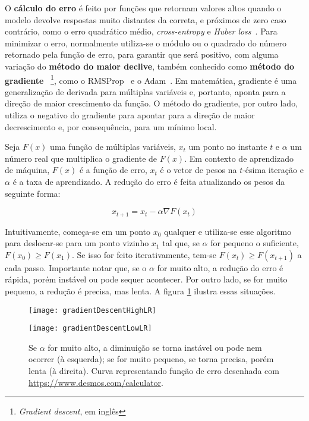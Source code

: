 O \textbf{cálculo do erro} é feito por funções que retornam valores altos quando o modelo devolve respostas muito distantes da correta, e próximos de zero caso contrário, como o erro quadrático médio, \textit{cross-entropy} e \textit{Huber loss}~\cite{huber_loss}.
Para minimizar o erro, normalmente utiliza-se o módulo ou o quadrado do número retornado pela função de erro, para garantir que será positivo, com alguma variação do \textbf{método do maior declive}, também conhecido como \textbf{método do gradiente}~\cite{cauchy1847} \footnote{\textit{Gradient descent}, em inglês}, como o RMSProp~\cite{rmsprop} e o Adam~\cite{DBLP:journals/corr/KingmaB14}.
Em matemática, gradiente é uma generalização de derivada para múltiplas variáveis e, portanto, aponta para a direção de maior crescimento da função.
O método do gradiente, por outro lado, utiliza o negativo do gradiente para apontar para a direção de maior decrescimento e, por consequência, para um mínimo local.

Seja $F(x)$ uma função de múltiplas variáveis, $x_{t}$ um ponto no instante $t$ e $\alpha$ um número real que multiplica o gradiente de $F(x)$.
Em contexto de aprendizado de máquina, $F(x)$ é a função de erro, $x_{t}$ é o vetor de pesos na $t$-ésima iteração e $\alpha$ é a taxa de aprendizado.
A redução do erro é feita atualizando os pesos da seguinte forma:

\begin{equation} \label{eq:error_update}
x_{t+1} = x_{t} - \alpha \nabla F(x_{t})
\end{equation}

Intuitivamente, começa-se em um ponto $x_{0}$ qualquer e utiliza-se esse algoritmo para deslocar-se para um ponto vizinho $x_{1}$ tal que, se $\alpha$ for pequeno o suficiente, $F(x_{0}) \geq F(x_{1})$.
Se isso for feito iterativamente, tem-se $F(x_{t}) \geq F(x_{t+1})$ a cada passo.
Importante notar que, se o $\alpha$ for muito alto, a redução do erro é rápida, porém instável ou pode sequer acontecer.
Por outro lado, se for muito pequeno, a redução é precisa, mas lenta.
A figura \ref{fig:gradientDescent} ilustra essas situações.

\begin{figure}[h!]
  \begin{minipage}[b]{.45\textwidth}
  \centering
  \texttt{[image: gradientDescentHighLR]}
  \label{fig:gdhighlr}
  \end{minipage}
  \hfill
  \begin{minipage}[b]{.45\textwidth}
  \centering
  \texttt{[image: gradientDescentLowLR]}
  \label{fig:gdlowlr}
  \end{minipage}
  \caption{Se $\alpha$ for muito alto, a diminuição se torna instável ou pode nem ocorrer (à esquerda); se for muito pequeno, se torna precisa, porém lenta (à direita). Curva representando função de erro desenhada com \url{https://www.desmos.com/calculator}.}
  \label{fig:gradientDescent}
\end{figure}

